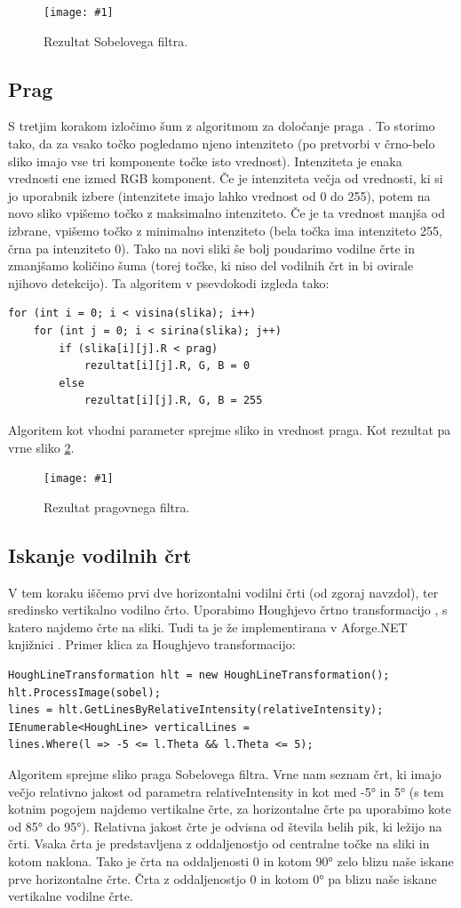 \documentclass[oneside, a4paper, 12pt]{book}
\newcommand{\slika}[3]{
	\begin{figure}
	\begin{center}
	\texttt{[image: \#1]}
	\end{center}
	\vspace{-20pt}
	\caption{#2}
	\label{#3}
	\end{figure}
}
\begin{document}
\slika{slike/sobel.jpg}{Rezultat Sobelovega filtra.}{pic:sobel}

\subsection{Prag}
S tretjim korakom izločimo šum z algoritmom za določanje praga 
\cite{treshold-wiki}. To storimo tako, da za vsako točko pogledamo 
njeno intenziteto (po pretvorbi v črno-belo sliko imajo vse tri komponente 
točke isto vrednost). Intenziteta je enaka vrednosti ene izmed RGB 
komponent. Če je intenziteta večja od vrednosti, ki si jo uporabnik 
izbere (intenzitete imajo lahko vrednost od 0 do 255), potem na novo 
sliko vpišemo točko z maksimalno intenziteto. Če je ta vrednost manjša 
od izbrane, vpišemo točko z minimalno intenziteto (bela točka ima 
intenziteto 255, črna pa intenziteto 0). Tako na novi sliki še bolj 
poudarimo vodilne črte in zmanjšamo količino šuma (torej točke, ki 
niso del vodilnih črt in bi ovirale njihovo detekcijo). Ta algoritem 
v psevdokodi izgleda tako:
\begin{samepage}
\begin{verbatim}
for (int i = 0; i < visina(slika); i++)
    for (int j = 0; i < sirina(slika); j++)
        if (slika[i][j].R < prag)
            rezultat[i][j].R, G, B = 0
        else
            rezultat[i][j].R, G, B = 255
\end{verbatim}
\end{samepage}
Algoritem kot vhodni parameter sprejme sliko in vrednost praga. Kot 
rezultat pa vrne sliko \ref{pic:treshold}.

\slika{slike/treshold.jpg}{Rezultat pragovnega filtra.}{pic:treshold}


\subsection{Iskanje vodilnih črt}
V tem koraku iščemo prvi dve horizontalni vodilni črti (od zgoraj 
navzdol), ter sredinsko vertikalno vodilno črto. Uporabimo Houghjevo 
črtno transformacijo \cite{hough-wiki}, s katero najdemo črte na sliki. 
Tudi ta je že implementirana v Aforge.NET knjižnici \cite{hough}. 
Primer klica za Houghjevo transformacijo:
\begin{samepage}
\begin{verbatim}
HoughLineTransformation hlt = new HoughLineTransformation();
hlt.ProcessImage(sobel);
lines = hlt.GetLinesByRelativeIntensity(relativeIntensity);
IEnumerable<HoughLine> verticalLines = 
lines.Where(l => -5 <= l.Theta && l.Theta <= 5);
\end{verbatim}
\end{samepage}
Algoritem sprejme sliko praga Sobelovega filtra. Vrne nam seznam črt, 
ki imajo večjo relativno jakost od parametra relativeIntensity in kot 
med -5° in 5° (s tem kotnim pogojem najdemo vertikalne črte, za 
horizontalne črte pa uporabimo kote od 85° do 95°). Relativna jakost 
črte je odvisna od števila belih pik, ki ležijo na črti. Vsaka črta je 
predstavljena z oddaljenostjo od centralne točke na sliki in kotom naklona. 
Tako je črta na oddaljenosti 0 in kotom 90° zelo blizu naše iskane prve 
horizontalne črte. Črta z oddaljenostjo 0 in kotom 0° pa blizu naše 
iskane vertikalne vodilne črte. \cite{hough} 
\end{document}
